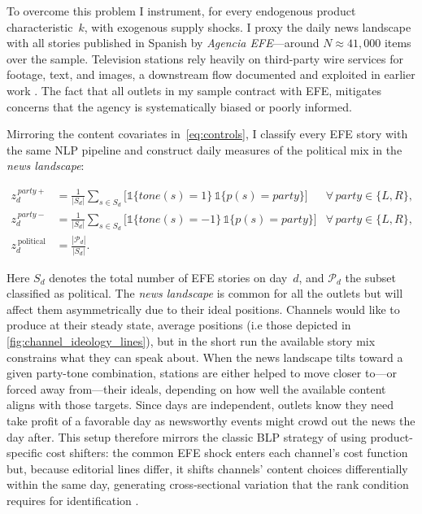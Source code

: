 \documentclass[12pt]{article}
\begin{document}
	To overcome this problem I instrument, for every endogenous product characteristic~$k$, with exogenous supply shocks.  
	I proxy the daily news landscape with all stories published in Spanish by \emph{Agencia EFE}—around $N\!\approx\!41{,}000$ items over the sample.  
	Television stations rely heavily on third-party wire services for footage, text, and images, a downstream flow documented and exploited in earlier work \citep{milena}.  The fact that all outlets in my sample contract with EFE, mitigates concerns that the agency is systematically biased or poorly informed. 
	
	Mirroring the content covariates in~\eqref{eq:controls}, I classify every EFE story with the same NLP pipeline and construct daily measures of the political mix in the \emph{news landscape}:
	
	\begin{equation}\label{eq:first_stage}
		\begin{aligned}
			z_d^{\,party+} &= \frac{1}{|S_d|}\sum_{s\in S_d}
			\bigl[\mathds{1}\{tone(s)=1\}\,\mathds{1}\{p(s)=\textit{party}\}\bigr]
			&\forall\,\textit{party}\in\{L,R\},\\
			z_d^{\,party-} &= \frac{1}{|S_d|}\sum_{s\in S_d}
			\bigl[\mathds{1}\{tone(s)=-1\}\,\mathds{1}\{p(s)=\textit{party}\}\bigr]
			&\forall\,\textit{party}\in\{L,R\},\\
			z_d^{\,\text{political}} &= \frac{|\mathcal{P}_d|}{|S_d|}.
		\end{aligned}
	\end{equation}
	
	Here $S_d$ denotes the total number of EFE stories on day~$d$, and $\mathcal{P}_d$ the subset classified as political. The \textit{news landscape} is common for all the outlets but will affect them asymmetrically due to their ideal positions. Channels would like to produce at their steady state, average positions (i.e those depicted in \ref{fig:channel_ideology_lines}), but in the short run the available story mix constrains what they can speak about. 
	When the news landscape tilts toward a given party-tone combination, stations are either helped to move closer to—or forced away from—their ideals, depending on how well the available content aligns with those targets. Since days are independent, outlets know they need take profit of a favorable day as newsworthy events might crowd out the news the day after. This setup therefore mirrors the classic BLP strategy of using product-specific cost shifters: the common EFE shock enters each channel’s cost function but, because editorial lines differ, it shifts channels’ content choices differentially within the same day, generating cross-sectional variation that  the  rank condition requires for identification \citep{berry_haile_econometrica}.
	
\end{document}
